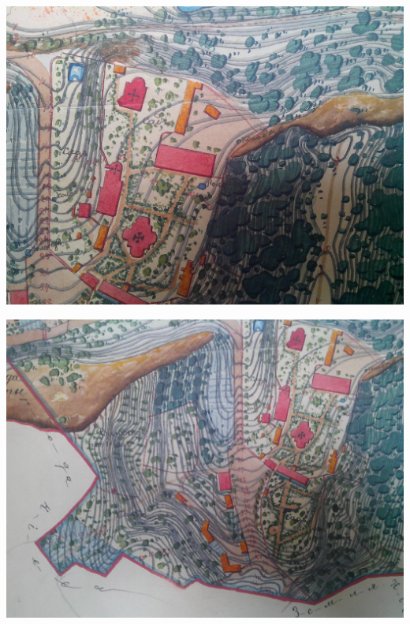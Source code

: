 \begin{center}
\includegraphics[width=\linewidth]{chast-vosp/zver/IMG_20170627_154143.jpg}
\end{center}

\begin{center}
\includegraphics[width=\linewidth]{chast-vosp/zver/IMG_20170627_153942.jpg}
\end{center}

